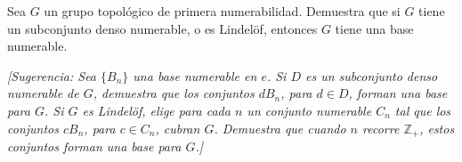  \item[*18.] Sea $G$ un grupo topológico de primera numerabilidad. Demuestra que si $G$ tiene un subconjunto denso numerable, o es Lindelöf, entonces $G$ tiene una base numerable.  

    \textit{[Sugerencia: Sea $\{B_n\}$ una base numerable en $e$. Si $D$ es un subconjunto denso numerable de $G$, demuestra que los conjuntos $dB_n$, para $d \in D$, forman una base para $G$.  
    Si $G$ es Lindelöf, elige para cada $n$ un conjunto numerable $C_n$ tal que los conjuntos $cB_n$, para $c \in C_n$, cubran $G$. Demuestra que cuando $n$ recorre $\mathbb{Z}_{+}$, estos conjuntos forman una base para $G$.]}
